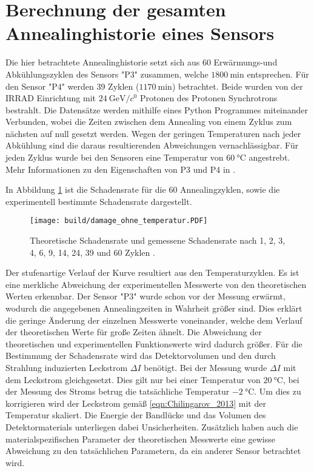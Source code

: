 \section{Berechnung der gesamten Annealinghistorie eines Sensors}
Die hier betrachtete Annealinghistorie setzt sich aus 60 Erwärmungs-und
Abkühlungszyklen des Sensors "P3" zusammen, welche $\SI{1800}{\minute}$ entsprechen.
Für den Sensor "P4" werden 39 Zyklen ($\SI{1170}{\minute}$) betrachtet.
Beide wurden von der ${\mathrm{IRRAD}}$ Einrichtung mit $\SI{24}{\giga\eV\per\clight}$ Protonen des Protonen Synchrotrons bestrahlt.
Die Datensätze werden mithilfe eines Python Programmes miteinander Verbunden,
wobei die Zeiten zwischen dem Annealing von einem Zyklus zum nächsten auf null gesetzt werden. Wegen der geringen
Temperaturen nach jeder Abkühlung sind die daraus resultierenden Abweichungen vernachlässigbar.
Für jeden Zyklus wurde bei den Sensoren eine Temperatur von $\SI{60}{\celsius}$ angestrebt.
Mehr Informationen zu den Eigenschaften von P3 und P4 in  \cite{felix}.


In Abbildung \ref{fig:P_3} ist die Schadensrate für die 60 Annealingzyklen,
sowie die experimentell bestimmte Schadensrate dargestellt.

\begin{figure}
  \centering
    \texttt{[image: build/damage\_ohne\_temperatur.PDF]}
\caption{Theoretische Schadensrate und gemessene Schadensrate nach 1, 2, 3, 4, 6, 9, 14, 24, 39 und 60 Zyklen .}
\label{fig:P_3}
\end{figure}

Der stufenartige Verlauf der Kurve resultiert aus den Temperaturzyklen.
Es ist eine merkliche Abweichung der experimentellen Messwerte von den theoretischen
Werten erkennbar. Der Sensor "P3" wurde schon vor der Messung erwärmt, wodurch
die angegebenen Annealingzeiten in Wahrheit größer sind. Dies erklärt die
geringe Änderung der einzelnen Messwerte voneinander, welche dem
Verlauf der theoretischen Werte für große Zeiten ähnelt. Die Abweichung der theoretischen
und experimentellen Funktionswerte wird dadurch größer.
Für die Bestimmung der Schadensrate wird das Detektorvolumen und den durch
Strahlung induzierten Leckstrom $\Delta I$ benötigt. Bei der Messung wurde
$\Delta I$ mit dem Leckstrom gleichgesetzt. Dies gilt nur bei einer Temperatur
von $\SI{20}{\celsius}$, bei der Messung des Stroms betrug die tatsächliche Temperatur
$\SI{-2}{\celsius}$. Um dies zu korrigieren wird der Leckstrom gemäß \ref{eqn:Chilingarov_2013}
mit der Temperatur skaliert. Die Energie der Bandlücke und das Volumen des Detektormaterials
unterliegen dabei Unsicherheiten. Zusätzlich haben auch die materialspezifischen Parameter
der theoretischen Messwerte eine gewisse Abweichung zu den tatsächlichen Parametern, da
ein anderer Sensor betrachtet wird.


